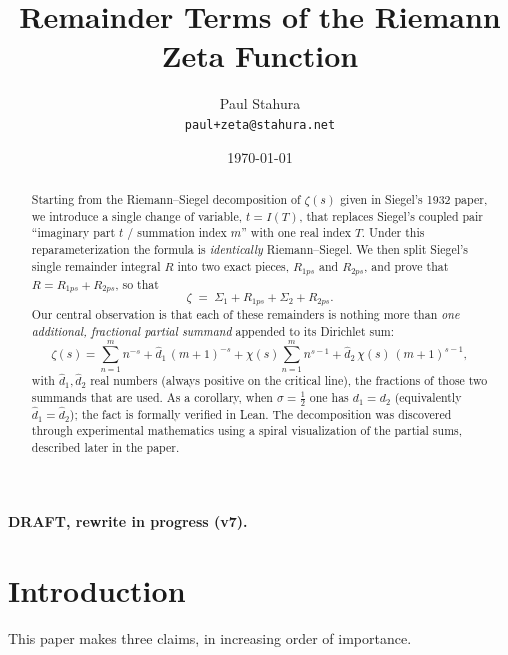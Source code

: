 \documentclass[11pt]{article}
\title{\textbf{Remainder Terms of the Riemann Zeta Function}}
\author{Paul Stahura\\[0.3em]\small\texttt{paul+zeta@stahura.net}}
\date{\today}
\theoremstyle{definition}
\begin{document}
\maketitle

\begin{center}
{\color{red}\textbf{DRAFT, rewrite in progress (v7).}}
\end{center}

\begin{abstract}
Starting from the Riemann--Siegel decomposition of $\zeta(s)$ given in Siegel's
1932 paper, we introduce a single change of variable, $t=I(T)$, that replaces
Siegel's coupled pair ``imaginary part $t$ / summation index $m$'' with one real
index $T$. Under this reparameterization the formula is \emph{identically}
Riemann--Siegel. We then split Siegel's single remainder integral $R$ into two
exact pieces, $R_{1ps}$ and $R_{2ps}$, and prove that
$R = R_{1ps}+R_{2ps}$, so that
\[
\zeta \;=\; \Sigma_{1} + R_{1ps} + \Sigma_{2} + R_{2ps}.
\]
Our central observation is that each of these remainders is nothing more than
\emph{one additional, fractional partial summand} appended to its Dirichlet sum:
\[
\zeta(s)=\sum_{n=1}^{m} n^{-s} + \hat d_1\,(m+1)^{-s}
        + \chi(s)\sum_{n=1}^{m} n^{s-1} + \hat d_2\,\chi(s)\,(m+1)^{s-1},
\]
with $\hat d_1,\hat d_2$ real numbers (always positive on the critical line),
the fractions of those two
summands that are used. As a corollary, when $\sigma=\tfrac12$ one
has $d_1=d_2$ (equivalently $\hat d_1=\hat d_2$); the fact is formally
verified in Lean. The decomposition was
discovered through experimental mathematics using a spiral visualization of the
partial sums, described later in the paper.
\end{abstract}

\tableofcontents
\newpage

\section{Introduction}

This paper makes three claims, in increasing order of importance.
\end{document}
